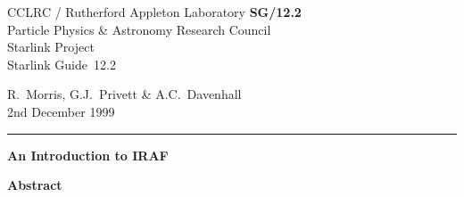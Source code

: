 \documentclass[twoside,11pt]{article}
\newcommand{\stardoccategory}  {Starlink Guide}
\newcommand{\stardocinitials}  {SG}
\newcommand{\stardocnumber}    {12.2}
\newcommand{\stardocauthors}   {R.~Morris, G.J.~Privett \& A.C.~Davenhall}
\newcommand{\stardocdate}      {2nd December 1999}
\newcommand{\stardoctitle}     {An Introduction to IRAF}
\newcommand{\stardocname}{\stardocinitials /\stardocnumber}
\newenvironment{latexonly}{}{}
\begin{document}
\thispagestyle{empty}

\begin{latexonly}
   CCLRC / {\sc Rutherford Appleton Laboratory} \hfill {\bf \stardocname}\\
   {\large Particle Physics \& Astronomy Research Council}\\
   {\large Starlink Project\\}
   {\large \stardoccategory\ \stardocnumber}
   \begin{flushright}
   \stardocauthors\\
   \stardocdate
   \end{flushright}
   \vspace{-4mm}
   \rule{\textwidth}{0.5mm}
   \vspace{5mm}
   \begin{center}
   {\Huge\bf  \stardoctitle}
   \end{center}
   \vspace{5mm}


   \vspace{10mm}
   \begin{center}
      {\Large\bf Abstract}
   \end{center}
\end{latexonly}
\end{document}

